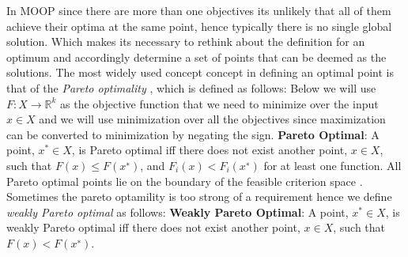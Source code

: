 \newpage
{}
In MOOP since there are more than one objectives its unlikely that all of them achieve their optima at the same point, hence typically there is no single global solution. Which makes its necessary to rethink about the definition for an optimum and accordingly determine a set of points that can be deemed as the solutions. The most widely used concept concept in defining an optimal point is that of the \textit{Pareto optimality} \cite{pareto1971manual}, which is defined as follows:\newline 
Below we will use $F: X \to \mathbb{R}^k$ as the objective function that we need to minimize over the input $x\in X$ and we will use minimization over all the objectives since maximization can be converted to minimization by negating the sign.\newline\newline
\textbf{Pareto Optimal}: A point, $x^{*} \in X$, is
Pareto optimal iff there does not exist another point, $x \in X$, such that $F(x) \le F(x^{∗})$, and $F_i(x)<F_i(x^{∗})$ for at least one function. 
\newline\newline
All Pareto optimal points lie on the boundary of the feasible criterion space \cite{Athan1996-cm}. Sometimes the pareto optamility is too strong of a requirement hence we define \textit{weakly Pareto optimal} as follows:\newline\newline
\textbf{Weakly Pareto Optimal}: A point, $x^{*} \in X$, is weakly Pareto optimal iff there does not exist another point, $x \in X$, such that $F(x) < F(x^{∗})$.\newline\newline
